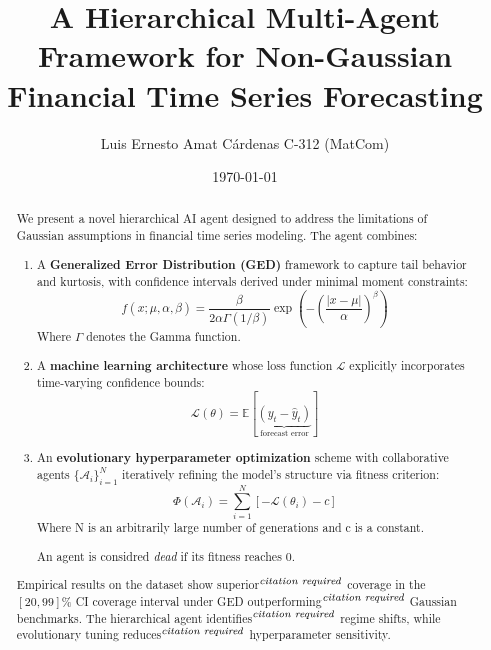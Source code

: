 \documentclass[12pt]{article}
\title{A Hierarchical Multi-Agent Framework for Non-Gaussian Financial Time Series Forecasting}
\author{Luis Ernesto Amat Cárdenas C-312 (MatCom)}
\date{\today}
\begin{document}
\maketitle

\begin{abstract}
We present a novel hierarchical AI agent designed to address the limitations of Gaussian assumptions in financial time series modeling. The agent combines:

\begin{enumerate}
    \item A \textbf{Generalized Error Distribution (GED)\cite{giller2005}} framework to capture tail behavior and kurtosis, with confidence intervals derived under minimal moment constraints:
    \begin{equation*}
        f(x; \mu, \alpha, \beta) = \frac{\beta}{2\alpha\Gamma(1/\beta)} \exp\left(-\left(\frac{|x-\mu|}{\alpha}\right)^\beta\right)
    \end{equation*}
    Where $\Gamma$ denotes the Gamma function.
    
    \item A \textbf{machine learning architecture} whose loss function $\mathscr{L}$ explicitly incorporates time-varying confidence bounds:
    \begin{equation*}
        \mathscr{L}(\theta) = \mathbb{E}\left[ \underbrace{(y_t - \hat{y}_t)}_{\text{forecast error}} \right]
    \end{equation*}
    
    \item An \textbf{evolutionary hyperparameter optimization} scheme with collaborative agents $\{\mathscr{A}_i\}_{i=1}^N$ iteratively refining the model's structure via fitness criterion:
    \begin{equation*}
        \Phi(\mathscr{A}_i) = \sum_{i=1}^N \left[ -\mathscr{L}(\theta_i) - c \right]
    \end{equation*}
    Where N is an arbitrarily large number of generations and c is a constant.

    An agent is considred \emph{dead} if its fitness reaches 0.
\end{enumerate}

    Empirical results on the dataset show superior$^\emph{citation required}$ coverage in the $[20, 99]$\% CI coverage interval under GED outperforming$^\emph{citation required}$ Gaussian benchmarks. The hierarchical agent identifies$^\emph{citation required}$ regime shifts, while evolutionary tuning reduces$^\emph{citation required}$ hyperparameter sensitivity. 


\end{abstract}
\end{document}
